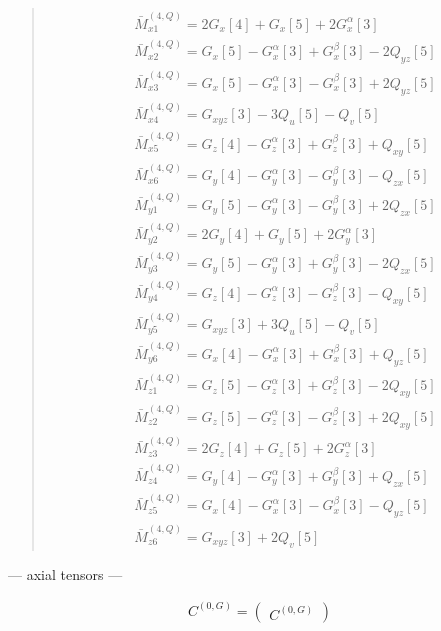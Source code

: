 \documentclass[fleqn,10pt]{jsarticle}
\begin{document}
\begin{quote}
\begin{align*}
& \bar{M}^{(4,Q)}_{x1} = 2 G_{x}[4] + G_{x}[5] + 2 G_{x}^{\alpha}[3] \\
& \bar{M}^{(4,Q)}_{x2} = G_{x}[5] - G_{x}^{\alpha}[3] + G_{x}^{\beta}[3] - 2 Q_{yz}[5] \\
& \bar{M}^{(4,Q)}_{x3} = G_{x}[5] - G_{x}^{\alpha}[3] - G_{x}^{\beta}[3] + 2 Q_{yz}[5] \\
& \bar{M}^{(4,Q)}_{x4} = G_{xyz}[3] - 3 Q_{u}[5] - Q_{v}[5] \\
& \bar{M}^{(4,Q)}_{x5} = G_{z}[4] - G_{z}^{\alpha}[3] + G_{z}^{\beta}[3] + Q_{xy}[5] \\
& \bar{M}^{(4,Q)}_{x6} = G_{y}[4] - G_{y}^{\alpha}[3] - G_{y}^{\beta}[3] - Q_{zx}[5] \\
& \bar{M}^{(4,Q)}_{y1} = G_{y}[5] - G_{y}^{\alpha}[3] - G_{y}^{\beta}[3] + 2 Q_{zx}[5] \\
& \bar{M}^{(4,Q)}_{y2} = 2 G_{y}[4] + G_{y}[5] + 2 G_{y}^{\alpha}[3] \\
& \bar{M}^{(4,Q)}_{y3} = G_{y}[5] - G_{y}^{\alpha}[3] + G_{y}^{\beta}[3] - 2 Q_{zx}[5] \\
& \bar{M}^{(4,Q)}_{y4} = G_{z}[4] - G_{z}^{\alpha}[3] - G_{z}^{\beta}[3] - Q_{xy}[5] \\
& \bar{M}^{(4,Q)}_{y5} = G_{xyz}[3] + 3 Q_{u}[5] - Q_{v}[5] \\
& \bar{M}^{(4,Q)}_{y6} = G_{x}[4] - G_{x}^{\alpha}[3] + G_{x}^{\beta}[3] + Q_{yz}[5] \\
& \bar{M}^{(4,Q)}_{z1} = G_{z}[5] - G_{z}^{\alpha}[3] + G_{z}^{\beta}[3] - 2 Q_{xy}[5] \\
& \bar{M}^{(4,Q)}_{z2} = G_{z}[5] - G_{z}^{\alpha}[3] - G_{z}^{\beta}[3] + 2 Q_{xy}[5] \\
& \bar{M}^{(4,Q)}_{z3} = 2 G_{z}[4] + G_{z}[5] + 2 G_{z}^{\alpha}[3] \\
& \bar{M}^{(4,Q)}_{z4} = G_{y}[4] - G_{y}^{\alpha}[3] + G_{y}^{\beta}[3] + Q_{zx}[5] \\
& \bar{M}^{(4,Q)}_{z5} = G_{x}[4] - G_{x}^{\alpha}[3] - G_{x}^{\beta}[3] - Q_{yz}[5] \\
& \bar{M}^{(4,Q)}_{z6} = G_{xyz}[3] + 2 Q_{v}[5]
\end{align*}
\end{quote}
\newpage
\begin{center}\LARGE --- axial tensors ---\end{center}
\begin{align*}
C^{(0,G)} = \begin{pmatrix} C^{(0,G)} \end{pmatrix}
\end{align*}
\end{document}
